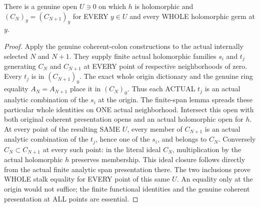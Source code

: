 \begin{theorem}
\label{hir:relative-normal-coherent-saturation-neighborhood-stability}
\leanok
{}
There is a genuine open $U\ni0$ on which $h$ is holomorphic and
$(C_N)_y=(C_{N+1})_y$ for EVERY $y\in U$ and every WHOLE
holomorphic germ at $y$.
\end{theorem}
\begin{proof}
Apply the genuine coherent-colon constructions to the actual
internally selected $N$ and $N+1$. They supply finite actual
holomorphic families $s_i$ and $t_j$ generating $C_N$ and
$C_{N+1}$ at EVERY point of respective neighborhoods of zero.
Every $t_j$ is in $(C_{N+1})_0$. The exact whole origin dictionary
and the genuine ring equality $A_N=A_{N+1}$ place it in $(C_N)_0$.
Thus each ACTUAL $t_j$ is an actual analytic combination of the
$s_i$ at the origin. The finite-span lemma spreads these particular
whole identities on ONE actual neighborhood. Intersect this open
with both original coherent presentation opens and an actual
holomorphic open for $h$. At every point of the resulting SAME
$U$, every member of $C_{N+1}$ is an actual analytic combination
of the $t_j$, hence one of the $s_i$, and belongs to $C_N$.
Conversely $C_N\subset C_{N+1}$ at every such point: in the literal
ideal $C_N$, multiplication by the actual holomorphic $h$ preserves
membership. This ideal closure follows directly from the actual
finite analytic span presentation there. The two inclusions prove
WHOLE stalk equality for EVERY point of this same $U$. An equality
only at the origin would not suffice; the finite functional
identities and the genuine coherent presentation at ALL points
are essential.
\end{proof}

